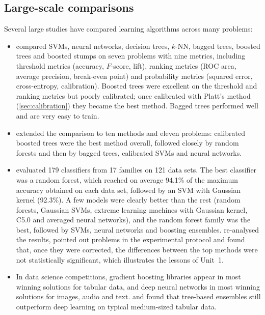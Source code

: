 \subsection{Large-scale comparisons}

Several large studies have compared learning algorithms across many problems:
\begin{itemize}
  \item \citet{caruana2004data} compared SVMs, neural networks, decision trees, $k$-NN, bagged
        trees, boosted trees and boosted stumps on seven problems with nine metrics, including
        threshold metrics (accuracy, $F$-score, lift), ranking metrics (ROC area, average
        precision, break-even point) and probability metrics (squared error, cross-entropy,
        calibration). Boosted trees were excellent on the threshold and ranking metrics but
        poorly calibrated; once calibrated with Platt's method (\cref{sec:calibration}) they
        became the best method. Bagged trees performed well and are very easy to train.
  \item \citet{caruana2006empirical} extended the comparison to ten methods and eleven problems:
        calibrated boosted trees were the best method overall, followed closely by random
        forests and then by bagged trees, calibrated SVMs and neural networks.
  \item \citet{fernandezdelgado2014we} evaluated 179 classifiers from 17 families on 121 data
        sets. The best classifier was a random forest, which reached on average 94.1\% of the
        maximum accuracy obtained on each data set, followed by an SVM with Gaussian kernel
        (92.3\%). A few models were clearly better than the rest (random forests, Gaussian SVMs,
        extreme learning machines with Gaussian kernel, C5.0 and averaged neural networks), and
        the random forest family was the best, followed by SVMs, neural networks and boosting
        ensembles. \citet{wainberg2016random} re-analysed the results, pointed out problems in the experimental protocol and found that,
        once they were corrected, the differences between the top methods were not
        statistically significant, which illustrates the lessons of
        Unit~1.
  \item In data science competitions, gradient
        boosting libraries appear in most winning solutions for tabular data, and deep neural networks
        in most winning solutions for images, audio and text. \citet{grinsztajn2022why} and \citet{shwartzziv2022tabular} found that tree-based ensembles still
        outperform deep learning on typical medium-sized tabular data.
\end{itemize}

